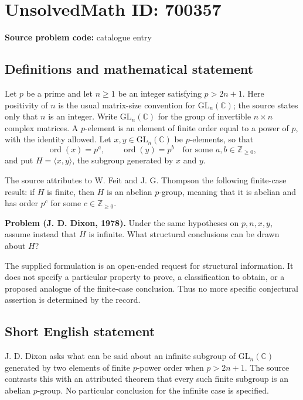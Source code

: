 \documentclass[11pt]{article}
\newcommand{\Z}{\mathbb{Z}}
\newcommand{\C}{\mathbb{C}}
\begin{document}
\section*{UnsolvedMath ID: 700357}
\textbf{Source problem code:} catalogue entry
\subsection{Definitions and mathematical statement}
Let \(p\) be a prime and let \(n\geq 1\) be an integer satisfying \(p>2n+1\). Here positivity of \(n\) is the usual matrix-size convention for \(\mathrm{GL}_n(\C)\); the source states only that \(n\) is an integer. Write \(\mathrm{GL}_n(\C)\) for the group of invertible \(n\times n\) complex matrices. A \(p\)-element is an element of finite order equal to a power of \(p\), with the identity allowed. Let \(x,y\in\mathrm{GL}_n(\C)\) be \(p\)-elements, so that
\[
\operatorname{ord}(x)=p^a,\qquad \operatorname{ord}(y)=p^b
\quad\text{for some }a,b\in\Z_{\geq 0},
\]
and put \(H=\langle x,y\rangle\), the subgroup generated by \(x\) and \(y\).

The source attributes to W. Feit and J. G. Thompson the following finite-case result: if \(H\) is finite, then \(H\) is an abelian \(p\)-group, meaning that it is abelian and has order \(p^c\) for some \(c\in\Z_{\geq 0}\).

\textbf{Problem (J. D. Dixon, 1978).} Under the same hypotheses on \(p,n,x,y\), assume instead that \(H\) is infinite. What structural conclusions can be drawn about \(H\)?

The supplied formulation is an open-ended request for structural information. It does not specify a particular property to prove, a classification to obtain, or a proposed analogue of the finite-case conclusion. Thus no more specific conjectural assertion is determined by the record.
\subsection{Short English statement}
J. D. Dixon asks what can be said about an infinite subgroup of \(\mathrm{GL}_n(\C)\) generated by two elements of finite \(p\)-power order when \(p>2n+1\). The source contrasts this with an attributed theorem that every such finite subgroup is an abelian \(p\)-group. No particular conclusion for the infinite case is specified.
\end{document}
